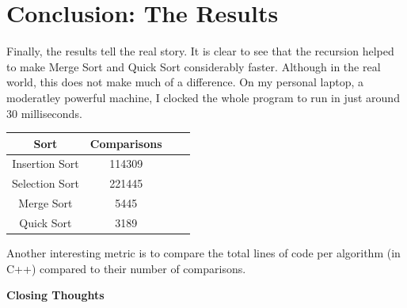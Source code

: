 \documentclass[letterpaper, 10pt]{article}
\begin{document}
\section{Conclusion: The Results}

Finally, the results tell the real story. It is clear to see that the recursion helped to make Merge Sort and Quick Sort considerably faster. Although in the real world, this does not make much of a difference. On my personal laptop, a moderatley powerful machine, I clocked the whole program to run in just around 30 milliseconds.

\begin{center}
{
 \begin{tabular}{||c c c c||} 
 \hline
 Sort & Comparisons \\ [0.5ex] 
 \hline\hline
 Insertion Sort& 114309 \\ 
 \hline
 Selection Sort& 221445 \\
 \hline
 Merge Sort& 5445 \\
 \hline
 Quick Sort& 3189 \\ [1ex] 
 \hline
\end{tabular}
}
\end{center}

Another interesting metric is to compare the total lines of code per algorithm (in C++) compared to their number of comparisons.


\begin{center}
\end{center}
\newpage
\textbf{Closing Thoughts}
\end{document}
